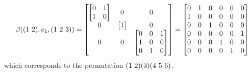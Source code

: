 \begin{remark}
  \[
  \beta(( 1 \, \, 2 ),e_1,(1 \,\, 2 \,\, 3)) =
  \begin{bmatrix}
  \begin{bmatrix}
  0 & 1 \\
  1 & 0
  \end{bmatrix} & 0 & 0 \\
  0 & \begin{bmatrix} 1 \end{bmatrix} & 0 \\
  0 & 0 &   \begin{bmatrix}
  0 & 0 & 1 \\
  1 & 0 & 0 \\
  0 & 1 & 0
  \end{bmatrix}
  \end{bmatrix}
  =
  \begin{bmatrix}
  0 & 1 & 0 & 0 & 0 & 0 \\
  1 & 0 & 0 & 0 & 0 & 0 \\
  0 & 0 & 1 & 0 & 0 & 0 \\
  0 & 0 & 0 & 0 & 0 & 1 \\
  0 & 0 & 0 & 1 & 0 & 0 \\
  0 & 0 & 0 & 0 & 1 & 0 \\
  \end{bmatrix}
  \]
which corresponds to the permutation $( 1 \, \, 2 )(3)(4 \,\, 5 \,\, 6)$.


\end{remark}
